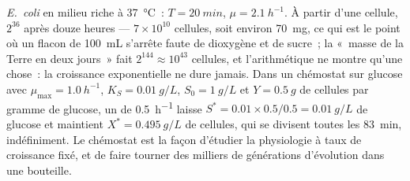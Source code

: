 \begin{example}\label{ex:b3:bacteriology:numbers}
\emph{E.~coli} en milieu riche à \qty{37}{\celsius}~: $T = \qty{20}{min}$,
$\mu = \qty{2.1}{h^{-1}}$. À partir d'une cellule, $2^{36}$ après douze
heures --- $7\times 10^{10}$ cellules, soit environ \qty{70}{mg}, ce
qui est le point où un flacon de \qty{100}{mL} s'arrête faute de
dioxygène et de sucre~; la «~masse de la Terre en deux jours~» fait
$2^{144}\approx 10^{43}$ cellules, et l'arithmétique ne montre qu'une
chose~: la croissance exponentielle ne dure jamais. Dans un chémostat
sur glucose avec $\mu_{\max} = \qty{1.0}{h^{-1}}$, $K_{S} =
\qty{0.01}{g/L}$, $S_{0} = \qty{1}{g/L}$ et $Y = \qty{0.5}{g}$ de
cellules par gramme de glucose, un  de
\qty{0.5}{h^{-1}} laisse $S^{*}
= 0.01\times 0.5/0.5 = \qty{0.01}{g/L}$ de glucose et maintient $X^{*} =
\qty{0.495}{g/L}$ de cellules, qui se divisent toutes les \qty{83}{min},
indéfiniment. Le chémostat est la façon d'étudier la physiologie à taux
de croissance fixé, et de faire tourner des milliers de générations
d'évolution dans une bouteille.
\end{example}


